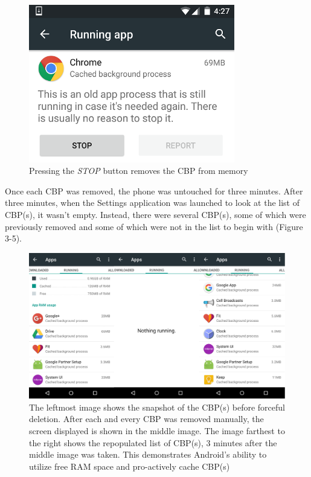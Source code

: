 \documentclass[12pt]{uthesis-v12}  %
\begin{document}
					\begin{figure}[!ht]
						\centering
						\includegraphics[width = 90mm]{images/removeCBP3.png}
						\caption[Remove CBP]
						{Pressing the {\em STOP} button removes the CBP from memory}
					\end{figure}					
					
					Once each CBP was removed, the phone was untouched for three minutes. After three minutes, when the Settings application was launched to look at the list of CBP(s), it wasn't empty. Instead, there were several CBP(s), some of which were previously removed and some of which were not in the list to begin with (Figure 3-5). 
					
					\begin{figure}[!ht]
						\centering
						\includegraphics[width = 130mm]{images/stage123.png}
						\caption[CBP(s) before and after manual removal]
						{The leftmost image shows the snapshot of the CBP(s) before forceful deletion. After each and every CBP was removed manually, the screen displayed is shown in the middle image. The image farthest to the right shows the repopulated list of CBP(s), 3 minutes after the middle image was taken. This demonstrates Android's ability to utilize free RAM space and pro-actively cache CBP(s)}
					\end{figure}					
					
\end{document}
